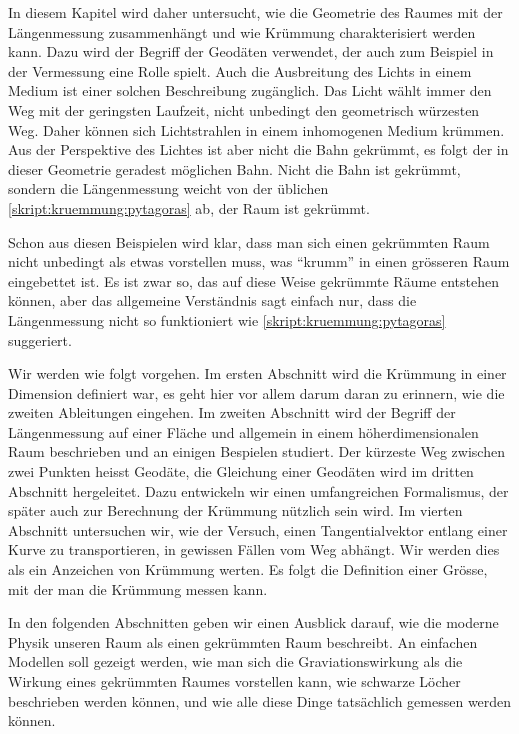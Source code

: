 In diesem Kapitel wird daher untersucht, wie die Geometrie des Raumes
mit der Längenmessung zusammenhängt und wie Krümmung charakterisiert
werden kann.
Dazu wird der Begriff der Geodäten verwendet, der auch zum Beispiel
in der Vermessung eine Rolle spielt.
Auch die Ausbreitung des Lichts in einem Medium ist einer solchen
Beschreibung zugänglich.
Das Licht wählt immer den Weg mit der geringsten Laufzeit, nicht
unbedingt den geometrisch würzesten Weg.
Daher können sich Lichtstrahlen in einem inhomogenen Medium
krümmen.
Aus der Perspektive des Lichtes ist aber nicht die Bahn gekrümmt,
es folgt der in dieser Geometrie geradest möglichen Bahn.
Nicht die Bahn ist gekrümmt, sondern die Längenmessung weicht von
der üblichen \eqref{skript:kruemmung:pytagoras} ab, der Raum ist
gekrümmt.

Schon aus diesen Beispielen wird klar, dass man sich einen gekrümmten
Raum nicht unbedingt als etwas vorstellen muss, was ``krumm'' in einen
grösseren Raum eingebettet ist. 
Es ist zwar so, das auf diese Weise gekrümmte Räume entstehen können,
aber das allgemeine Verständnis sagt einfach nur, dass die Längenmessung
nicht so funktioniert wie \eqref{skript:kruemmung:pytagoras} suggeriert.

Wir werden wie folgt vorgehen.
Im ersten Abschnitt wird die Krümmung in einer Dimension definiert war,
es geht hier vor allem darum daran zu erinnern, wie die zweiten
Ableitungen eingehen.
Im zweiten Abschnitt wird der Begriff der Längenmessung auf einer
Fläche und allgemein in einem höherdimensionalen Raum beschrieben
und an einigen Bespielen studiert.
Der kürzeste Weg zwischen zwei Punkten heisst Geodäte, die Gleichung
einer Geodäten wird im dritten Abschnitt hergeleitet.
Dazu entwickeln wir einen umfangreichen Formalismus, der später auch
zur Berechnung der Krümmung nützlich sein wird.
Im vierten Abschnitt untersuchen wir, wie der Versuch, einen Tangentialvektor
entlang einer Kurve zu transportieren, in gewissen Fällen vom 
Weg abhängt.
Wir werden dies als ein Anzeichen von Krümmung werten.
Es folgt die Definition einer Grösse, mit der man die Krümmung messen
kann.

In den folgenden Abschnitten geben wir einen Ausblick darauf, wie 
die moderne Physik unseren Raum als einen gekrümmten Raum beschreibt.
An einfachen Modellen soll gezeigt werden, wie man sich die Graviationswirkung
als die Wirkung eines gekrümmten Raumes vorstellen kann, wie schwarze Löcher
beschrieben werden können, und wie alle diese Dinge tatsächlich gemessen
werden können.








